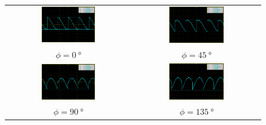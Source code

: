 \begin{figure}
  \centering
\begin{tabular}{cc}
  \includegraphics[width=0.45\textwidth]{content/img/screenshots/MAP003.png} &  \includegraphics[width=0.45\textwidth]{content/img/screenshots/MAP008.png} \\
  $\phi = \SI{0}{\degree}$ &
  $\phi = \SI{45}{\degree}$ \\[2em]
  \includegraphics[width=0.45\textwidth]{content/img/screenshots/MAP005.png} &  \includegraphics[width=0.45\textwidth]{content/img/screenshots/MAP010.png} \\
  $\phi = \SI{90}{\degree}$ &
  $\phi = \SI{135}{\degree}$ \\[2em]

\end{tabular}
\end{figure}
